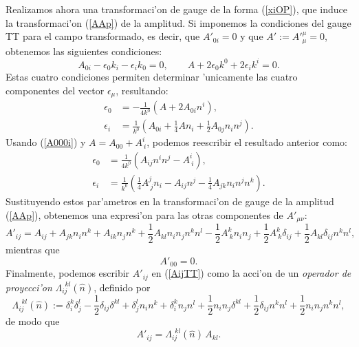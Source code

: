 Realizamos ahora una transformaci'on de gauge de la forma (\ref{xiOP}), que induce la transformaci'on (\ref{AAp}) de la amplitud. Si imponemos la condiciones del gauge TT para el campo transformado, es decir, que $A'_{0i}=0$ y que $A':=A'^\mu_{ \mu}=0$, obtenemos las siguientes condiciones:
\begin{equation}
A_{0i}-\epsilon_0k_i-\epsilon_ik_0=0, \qquad
A+2\epsilon_0k^0+2\epsilon_ik^i=0.
\end{equation}
Estas cuatro condiciones permiten determinar 'unicamente las cuatro componentes del vector $\epsilon_\mu$, resultando:
\begin{align}
\epsilon_0 &= -\frac{1}{4k^0}\left(A+2A_{0i}n^i\right) ,\\
\epsilon_i &= \frac{1}{k^0}\left(A_{0i}+\frac{1}{4}An_i+\frac{1}{2}A_{0j}n_in^j\right).
\end{align}
Usando (\ref{A000i}) y $A=A_{00}+A^i_{\ i}$, podemos reescribir el resultado anterior como:
\begin{align}
\epsilon_0 &= \frac{1}{4k^0}\left(A_{ij}n^in^j-A^i_{\ i}\right) ,\\
\epsilon_i &= \frac{1}{k^0}\left(\frac{1}{4}A^j_{\ j}n_i-A_{ij}n^j-\frac{1}{4}A_{jk}n_in^jn^k\right).
\end{align}
Sustituyendo estos par'ametros en la transformaci'on de gauge de la amplitud (\ref{AAp}), obtenemos una expresi'on para las otras componentes de $A'_{\mu\nu}$:
\begin{equation}\label{AijTT}
A'_{ij} = A_{ij}+A_{jk}n_in^k+A_{ik}n_jn^k+\frac{1}{2}A_{kl}n_in_jn^kn^l-\frac{1}{2}A^k_{\ k}n_in_j+\frac{1}{2}A^k_{\ k}\delta_{ij}+\frac{1}{2}A_{kl}\delta_{ij}n^kn^l,
\end{equation}
mientras que
\begin{equation}
A'_{00} = 0.
\end{equation}
Finalmente, podemos escribir $A'_{ij}$ en (\ref{AijTT}) como la acci'on de un \textit{operador de proyecci'on} $\Lambda_{ij}^{\ \ kl}(\hat{n})$, definido por
\begin{equation}
\boxed{\Lambda_{ij}^{\ \ kl}(\hat{n}):=\delta^k_i\delta^l_j-\frac{1}{2}\delta_{ij}\delta^{kl}+\delta^l_jn_in^k+\delta^k_in_jn^l +\frac{1}{2}n_in_j\delta^{kl} +\frac{1}{2}\delta_{ij}n^kn^l
+\frac{1}{2}n_in_jn^kn^l,}
\end{equation}
de modo que
\begin{equation}
\boxed{A'_{ij}=\Lambda_{ij}^{\ \ kl}(\hat{n})\,A_{kl}.}
\end{equation}

